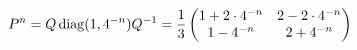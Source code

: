 \documentclass[preview]{standalone}
\begin{document}
\begin{align*}
\special{dvisvgm:raw <g id='unique000'>}P^n=Q\operatorname{diag}(1,4^{-n})Q^{-1}=\frac13\begin{pmatrix}1+2\cdot4^{-n}&2-2\cdot4^{-n}\\1-4^{-n}&2+4^{-n}\end{pmatrix}\special{dvisvgm:raw </g>}
\end{align*}
\end{document}
